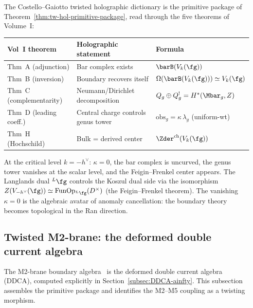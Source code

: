 \begin{remark}
\label{rem:tw-hol-dictionary}
The Costello--Gaiotto twisted holographic dictionary is the primitive
package of Theorem~\ref{thm:tw-hol-primitive-package}, read through the
five theorems of Volume~I:
\begin{center}
\renewcommand{\arraystretch}{1.2}
\small
\begin{tabular}{lll}
\textbf{Vol~I theorem} & \textbf{Holographic statement} & \textbf{Formula} \\
\hline
Thm~A (adjunction) & Bar complex exists & $\barB(V_k(\fg))$ \\
Thm~B (inversion) & Boundary recovers itself &
 $\Omega(\barB(V_k(\fg))) \simeq V_k(\fg)$ \\
Thm~C (complementarity) & Neumann/Dirichlet decomposition &
 $Q_g \oplus Q_g^! = H^*(\Mbar_g, Z)$ \\
Thm~D (leading coeff.) & Central charge controls genus tower &
 $\mathrm{obs}_g = \kappa\, \lambda_g$ (uniform-wt) \\
Thm~H (Hochschild) & Bulk = derived center &
 $\Zder^{\mathrm{ch}}(V_k(\fg))$
\end{tabular}
\end{center}
At the critical level $k = -h^\vee$: $\kappa = 0$, the bar complex
is uncurved, the genus tower vanishes at the scalar level, and the
Feigin--Frenkel center appears. The Langlands dual
${}^L\fg$ controls the Koszul dual side via the isomorphism
$Z(V_{-h^\vee}(\fg)) \simeq \operatorname{Fun}\!\operatorname{Op}_{{}^L\fg}(D^\times)$
(the Feigin--Frenkel theorem). The vanishing $\kappa = 0$ is
the algebraic avatar of anomaly cancellation: the boundary
theory becomes topological in the Ran direction.
\end{remark}

%
%

\subsection{Twisted M2-brane: the deformed double current algebra}
\label{subsec:twisted-M2-primitive}

The M2-brane boundary algebra~\cite{Costello-1705.02500v1}
is the deformed double current algebra (DDCA), computed
explicitly in Section~\ref{subsec:DDCA-ainfty}. This
subsection assembles the primitive package and
identifies the M2--M5 coupling as a twisting morphism.

